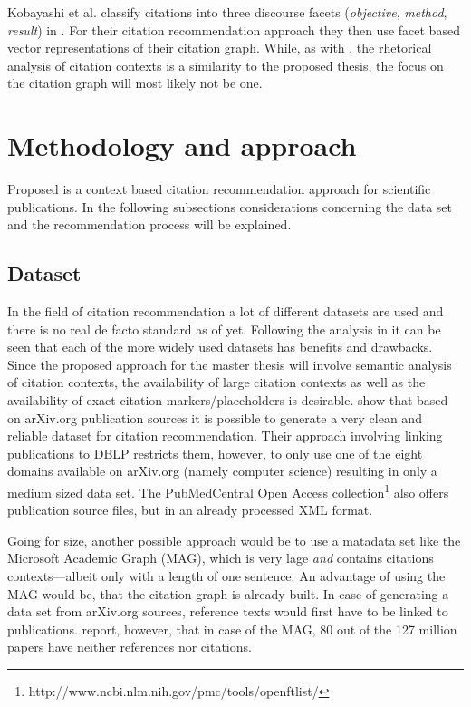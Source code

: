 \documentclass{proseminar}
\begin{document}
Kobayashi et al. classify citations into three discourse facets (\emph{objective}, \emph{method}, \emph{result}) in \cite{Kobayashi2018}. For their citation recommendation approach they then use facet based vector representations of their citation graph. While, as with \cite{Duma2016}, the rhetorical analysis of citation contexts is a similarity to the proposed thesis, the focus on the citation graph will most likely not be one.

\section{Methodology and approach}\label{meth}
Proposed is a context based citation recommendation approach for scientific publications. In the following subsections considerations concerning the data set and the recommendation process will be explained.

\subsection{Dataset}
In the field of citation recommendation a lot of different datasets are used and there is no real de facto standard as of yet. Following the analysis in \cite{Faerber} it can be seen that each of the more widely used datasets has benefits and drawbacks. Since the proposed approach for the master thesis will involve semantic analysis of citation contexts, the availability of large citation contexts as well as the availability of exact citation markers/placeholders is desirable. \cite{Faerber2018} show that based on arXiv.org publication sources it is possible to generate a very clean and reliable dataset for citation recommendation. Their approach involving linking publications to DBLP restricts them, however, to only use one of the eight domains available on arXiv.org (namely computer science) resulting in only a medium sized data set. The PubMedCentral Open Access collection\footnote{http://www.ncbi.nlm.nih.gov/pmc/tools/openftlist/} also offers publication source files, but in an already processed XML format.

Going for size, another possible approach would be to use a matadata set like the Microsoft Academic Graph\cite{Sinha2015} (MAG), which is very lage \emph{and} contains citations contexts---albeit only with a length of one sentence. An advantage of using the MAG would be, that the citation graph is already built. In case of generating a data set from arXiv.org sources, reference texts would first have to be linked to publications. \cite{Herrmannova2016} report, however, that in case of the MAG, 80 out of the 127 million papers have neither references nor citations.
\end{document}
